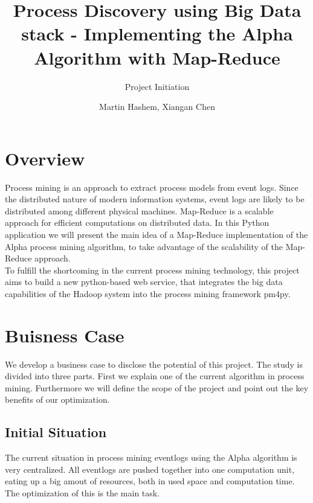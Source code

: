 \documentclass[runningheads]{llncs}
\begin{document}
%
\title{Process Discovery using Big Data stack - Implementing the Alpha Algorithm with Map-Reduce}
\subtitle{Project Initiation}
%
%

\author{Martin Hashem, Xiangan Chen}

%
\maketitle              %
%
%
%	
%
\section{Overview}
Process mining is an approach to extract process models from event logs. Since the distributed nature of modern information systems, event logs are likely to be distributed among different physical machines. Map-Reduce is a scalable approach for efficient computations on distributed data. In this Python application we will present the main idea of a Map-Reduce implementation of the Alpha process mining algorithm, to take advantage of the scalability of the Map-Reduce approach.\\

\noindent
To fulfill the shortcoming in the current process mining technology, this project aims to build a new python-based web service, that integrates the big data capabilities of the Hadoop system into the process mining framework pm4py.
\section{Buisness Case}
We develop a business case to disclose the potential of this project. The study is divided into three parts. First we explain one of the current algorithm in process mining. Furthermore we will define the scope of the project and point out the key benefits of our optimization.
\subsection{Initial Situation}
The current situation in process mining eventlogs using the Alpha algorithm is very centralized. All eventlogs are pushed together into one computation unit, eating up a big amout of resources, both in used space and computation time. The optimization of this is the main task.
\end{document}
